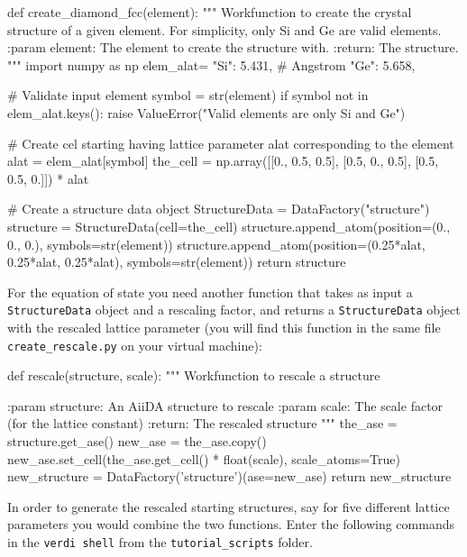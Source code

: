 \begin{pythoncommand}
def create_diamond_fcc(element):
    """
    Workfunction to create the crystal structure of a given element.
    For simplicity, only Si and Ge are valid elements.
    :param element: The element to create the structure with.
    :return: The structure.
    """
    import numpy as np
    elem_alat= {
                "Si": 5.431, # Angstrom
                "Ge": 5.658,
               }

    # Validate input element
    symbol = str(element)
    if symbol not in elem_alat.keys():
       raise ValueError("Valid elements are only Si and Ge")

    # Create cel starting having lattice parameter alat corresponding to the element
    alat = elem_alat[symbol]
    the_cell = np.array([[0., 0.5, 0.5],
                         [0.5, 0., 0.5],
                         [0.5, 0.5, 0.]]) * alat

    # Create a structure data object
    StructureData = DataFactory("structure")
    structure = StructureData(cell=the_cell)
    structure.append_atom(position=(0., 0., 0.), symbols=str(element))
    structure.append_atom(position=(0.25*alat, 0.25*alat, 0.25*alat),
                          symbols=str(element))
    return structure
\end{pythoncommand}

For the equation of state you need another function that takes as input a \texttt{StructureData} object and a rescaling factor, and returns a \texttt{StructureData} object with the rescaled lattice parameter (you will find this function in the same file \texttt{create\_rescale.py} on your virtual machine):

\begin{pythoncommand}
def rescale(structure, scale):
    """
    Workfunction to rescale a structure

    :param structure: An AiiDA structure to rescale
    :param scale: The scale factor (for the lattice constant)
    :return: The rescaled structure
    """
    the_ase = structure.get_ase()
    new_ase = the_ase.copy()
    new_ase.set_cell(the_ase.get_cell() * float(scale), scale_atoms=True)
    new_structure = DataFactory('structure')(ase=new_ase)
    return new_structure
\end{pythoncommand}

In order to generate the rescaled starting structures, say for five different lattice parameters you would combine the two functions. Enter the following commands in the \texttt{verdi shell} from the \texttt{tutorial\_scripts} folder.  

